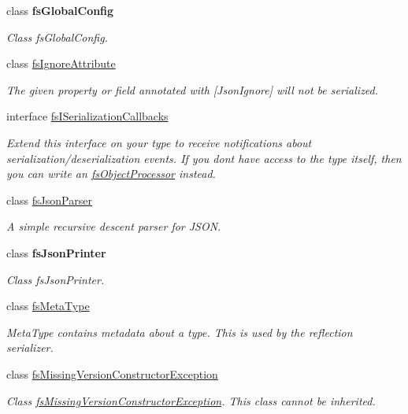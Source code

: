 \begin{DoxyCompactItemize}
class {\bfseries fs\+Global\+Config}
\begin{DoxyCompactList}\small\item\em Class fs\+Global\+Config. \end{DoxyCompactList}\item 
class \hyperlink{class_full_serializer_1_1fs_ignore_attribute}{fs\+Ignore\+Attribute}
\begin{DoxyCompactList}\small\item\em The given property or field annotated with \mbox{[}Json\+Ignore\mbox{]} will not be serialized. \end{DoxyCompactList}\item 
interface \hyperlink{interface_full_serializer_1_1fs_i_serialization_callbacks}{fs\+I\+Serialization\+Callbacks}
\begin{DoxyCompactList}\small\item\em Extend this interface on your type to receive notifications about serialization/deserialization events. If you don\textquotesingle{}t have access to the type itself, then you can write an \hyperlink{class_full_serializer_1_1fs_object_processor}{fs\+Object\+Processor} instead. \end{DoxyCompactList}\item 
class \hyperlink{class_full_serializer_1_1fs_json_parser}{fs\+Json\+Parser}
\begin{DoxyCompactList}\small\item\em A simple recursive descent parser for J\+S\+ON. \end{DoxyCompactList}\item 
class {\bfseries fs\+Json\+Printer}
\begin{DoxyCompactList}\small\item\em Class fs\+Json\+Printer. \end{DoxyCompactList}\item 
class \hyperlink{class_full_serializer_1_1fs_meta_type}{fs\+Meta\+Type}
\begin{DoxyCompactList}\small\item\em Meta\+Type contains metadata about a type. This is used by the reflection serializer. \end{DoxyCompactList}\item 
class \hyperlink{class_full_serializer_1_1fs_missing_version_constructor_exception}{fs\+Missing\+Version\+Constructor\+Exception}
\begin{DoxyCompactList}\small\item\em Class \hyperlink{class_full_serializer_1_1fs_missing_version_constructor_exception}{fs\+Missing\+Version\+Constructor\+Exception}. This class cannot be inherited. \end{DoxyCompactList}\item 

\end{DoxyCompactItemize}
